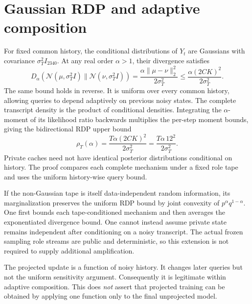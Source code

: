 \section{Gaussian RDP and adaptive composition}
For fixed common history, the conditional distributions of $Y_t$ are Gaussians with covariance $\sigma_T^2 I_{2340}$. At any real order $\alpha>1$, their divergence satisfies
\begin{equation}
 D_\alpha(\mathcal N(\mu,\sigma_T^2I)\|\mathcal N(\nu,\sigma_T^2I))
 =\frac{\alpha\|\mu-\nu\|_2^2}{2\sigma_T^2}
 \leq\frac{\alpha(2CK)^2}{2\sigma_T^2}.\label{eq:gaussrdp}
\end{equation}
The same bound holds in reverse. It is uniform over every common history, allowing queries to depend adaptively on previous noisy states. The complete transcript density is the product of conditional densities. Integrating the $\alpha$-moment of its likelihood ratio backwards multiplies the per-step moment bounds, giving the bidirectional RDP upper bound
\begin{equation}
 \rho_T(\alpha)=\frac{T\alpha(2CK)^2}{2\sigma_T^2}
              =\frac{T\alpha\,12^2}{2\sigma_T^2}.\label{eq:rdp}
\end{equation}
Private caches need not have identical posterior distributions conditional on history. The proof compares each complete mechanism under a fixed role tape and uses the uniform history-wise query bound.

If the non-Gaussian tape is itself data-independent random information, its marginalization preserves the uniform RDP bound by joint convexity of $p^\alpha q^{1-\alpha}$. One first bounds each tape-conditioned mechanism and then averages the exponentiated divergence bound. One cannot instead assume private state remains independent after conditioning on a noisy transcript. The actual frozen sampling role streams are public and deterministic, so this extension is not required to supply additional amplification.

The projected update is a function of noisy history. It changes later queries but not the uniform sensitivity argument. Consequently it is legitimate within adaptive composition. This does \emph{not} assert that projected training can be obtained by applying one function only to the final unprojected model.

